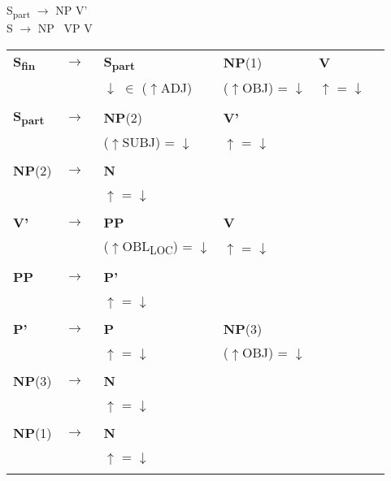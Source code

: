 \documentclass[12pt,a4paper]{article}
\begin{document}
S\textsubscript{part} $\rightarrow$ NP \: V'\\

S $\rightarrow$ NP \, VP \: V\\

\begin{tabular}{ l  l  l  l  l  l }
  \textbf{S\textsubscript{fin}} & $\rightarrow$ & \: \: \textbf{S\textsubscript{part}} & \: \: \textbf{NP}(1) & \: \textbf{V}\\
   & $\qquad$ &  $\downarrow$ $\in$ ($\uparrow$ADJ) & ($\uparrow$OBJ) = $\downarrow$ & $\uparrow$ = $\downarrow$ \\
   $\qquad$ & $\qquad$ \\
   \textbf{S\textsubscript{part}} & $\rightarrow$ & \: \: \textbf{NP}(2) & \: \textbf{V'}\\
   & $\qquad$ & ($\uparrow$SUBJ) = $\downarrow$ & $\uparrow$ = $\downarrow$ \\
   $\qquad$ & $\qquad$ \\
    \textbf{NP}(2) & $\rightarrow$ & \: \textbf{N} \\
   & $\qquad$ & $\uparrow$ = $\downarrow$\\
      $\qquad$ & $\qquad$ \\
    \textbf{V'} & $\rightarrow$ & \: \: \textbf{PP} & \: \: \textbf{V} & \\
   & $\qquad$ &($\uparrow$OBL\textsubscript{LOC}) = $\downarrow$  & \: $\uparrow$ = $\downarrow$\\
   $\qquad$ & $\qquad$ \\
    \textbf{PP} & $\rightarrow$ & \: \textbf{P'} \\
	& $\qquad$   & $\uparrow$ = $\downarrow$\\
   $\qquad$ & $\qquad$ \\
    \textbf{P'} & $\rightarrow$ & \: \textbf{P} & \: \: \textbf{NP}(3) \\
   & $\qquad$ & $\uparrow$ = $\downarrow$ & ($\uparrow$OBJ) = $\downarrow$ \\
   $\qquad$ & $\qquad$ \\
    \textbf{NP}(3) & $\rightarrow$ & \: \textbf{N} \\
   & $\qquad$ & $\uparrow$ = $\downarrow$\\
      $\qquad$ & $\qquad$ \\     
          \textbf{NP}(1) & $\rightarrow$ & \: \textbf{N} \\
   & $\qquad$ & $\uparrow$ = $\downarrow$\\
      $\qquad$ & $\qquad$ \\     
\end{tabular} 
\end{document}
